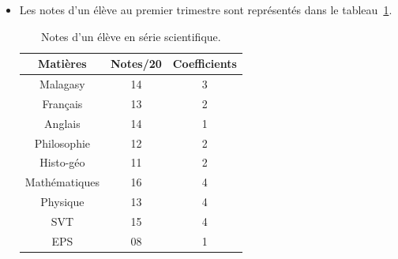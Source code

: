 \begin{defi}
\begin{itemize}
\begin{ex}
\begin{itemize}
                                                            trimestre sont : 8, 12 et 13.
                                                            La moyenne (simple) est donc $\frac{8 + 12 + 13}{3} = 11$.
                                                      \item Les notes d'un \'el\`eve au premier trimestre sont repr\'esent\'es
                                                            dans le tableau~\ref{tab:notes}.
                                                            \begin{table}[H]
                                                                  \centering
                                                                  \begin{tabular}{|c|c|c|}
                                                                  \hline
                                                                        Mati\`eres        & Notes/20 & Coefficients \\
                                                                  \hline
                                                                        Malagasy          &    14    &     3        \\
                                                                        Fran\c{c}ais      &    13    &     2        \\
                                                                        Anglais           &    14    &     1        \\
                                                                        Philosophie       &    12    &     2        \\
                                                                        Histo-g\'eo       &    11    &     2        \\
                                                                        Math\'ematiques   &    16    &     4        \\
                                                                        Physique          &    13    &     4        \\
                                                                        SVT               &    15    &     4        \\
                                                                        EPS               &    08    &     1        \\
                                                                  \hline
                                                                  \end{tabular}
                                                                  \caption{Notes d'un \'el\`eve en s\'erie scientifique.}
                                                                  \label{tab:notes}
                                                            \end{table}
                                                            

\end{itemize}
\end{ex}
\end{itemize}
\end{defi}
